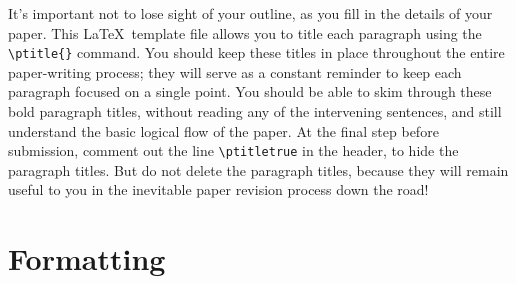 \documentclass[aps,prb,twocolumn,superscriptaddress,floatfix,longbibliography]{revtex4-2}
\newif\ifptitle
\newif\ifpnumber
\newcounter{para}
\newcommand\ptitle[1]{\par\refstepcounter{para}
{\ifpnumber{\noindent\textcolor{lightgray}{\textbf{\thepara}}\indent}\fi}
{\ifptitle{\textbf{[{#1}]}}\fi}}
\begin{document}
\ptitle{Maintain your outline} It's important not to lose sight of your outline, as you fill in the details of your paper. This \LaTeX\ template file allows you to title each paragraph using the {\tt \textbackslash ptitle\{\}} command. You should keep these titles in place throughout the entire paper-writing process; they will serve as a constant reminder to keep each paragraph focused on a single point. You should be able to skim through these bold paragraph titles, without reading any of the intervening sentences, and still understand the basic logical flow of the paper. At the final step before submission, comment out the line {\tt \textbackslash ptitletrue} in the header, to hide the paragraph titles. But do not delete the paragraph titles, because they will remain useful to you in the inevitable paper revision process down the road!

\section{\label{sec:Formatting}Formatting}
\end{document}
